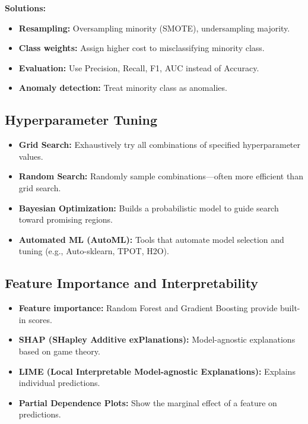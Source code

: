 \documentclass[11pt,a4paper]{article}
\begin{document}
\textbf{Solutions:}
\begin{itemize}[leftmargin=*]
  \item \textbf{Resampling:} Oversampling minority (SMOTE), undersampling majority.
  \item \textbf{Class weights:} Assign higher cost to misclassifying minority class.
  \item \textbf{Evaluation:} Use Precision, Recall, F1, AUC instead of Accuracy.
  \item \textbf{Anomaly detection:} Treat minority class as anomalies.
\end{itemize}

\subsection{Hyperparameter Tuning}
\begin{itemize}[leftmargin=*]
  \item \textbf{Grid Search:} Exhaustively try all combinations of specified hyperparameter values.
  \item \textbf{Random Search:} Randomly sample combinations---often more efficient than grid search.
  \item \textbf{Bayesian Optimization:} Builds a probabilistic model to guide search toward promising regions.
  \item \textbf{Automated ML (AutoML):} Tools that automate model selection and tuning (e.g., Auto-sklearn, TPOT, H2O).
\end{itemize}

\subsection{Feature Importance and Interpretability}
\begin{itemize}[leftmargin=*]
  \item \textbf{Feature importance:} Random Forest and Gradient Boosting provide built-in scores.
  \item \textbf{SHAP (SHapley Additive exPlanations):} Model-agnostic explanations based on game theory.
  \item \textbf{LIME (Local Interpretable Model-agnostic Explanations):} Explains individual predictions.
  \item \textbf{Partial Dependence Plots:} Show the marginal effect of a feature on predictions.
\end{itemize}

\end{document}
